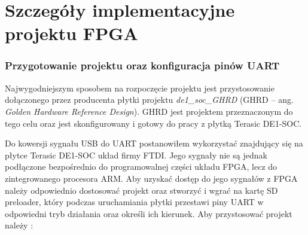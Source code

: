 \section{Szczegóły implementacyjne projektu FPGA}
\label{sec:szczegoly-implementacyjne-fpga}

\subsubsection{Przygotowanie projektu oraz konfiguracja pinów UART}
Najwygodniejszym sposobem na rozpoczęcie projektu jest przystosowanie dołączonego przez producenta płytki projektu \textit{de1\_soc\_GHRD} (GHRD -- ang. \textit{Golden Hardware Reference Design}). GHRD jest projektem przeznaczonym do tego celu oraz jest skonfigurowany i gotowy do pracy z płytką Terasic DE1-SOC.

Do kowersji sygnału USB do UART postanowiłem wykorzystać znajdujący się na płytce Terasic DE1-SOC układ firmy FTDI. Jego sygnały nie są jednak podłączone bezpośrednio do programowalnej części układu FPGA, lecz do zintegrowanego procesora ARM. Aby uzyskać dostęp do jego sygnałów z FPGA należy odpowiednio dostosować projekt oraz stworzyć i wgrać na kartę SD preloader, który podczas uruchamiania płytki przestawi piny UART w odpowiedni tryb działania oraz określi ich kierunek. Aby przystosować projekt należy \cite{altera-youtube-loanerio, altera-forum-fgga-hps-access, altera-forum-cant-rx}:

